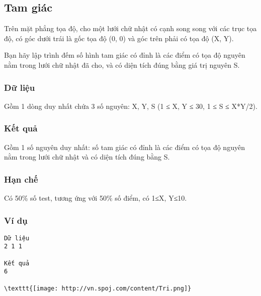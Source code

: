 



\subsection{   Tam giác  }

   Trên mặt phẳng tọa độ, cho một lưới chữ nhật có cạnh song song với các trục tọa độ,  có góc dưới   trái là gốc tọa độ (0, 0) và góc trên phải  có tọa độ (X, Y).  

   Bạn hãy lập trình đếm số hình tam giác có đỉnh là các điểm có tọa độ nguyên nằm trong lưới chữ   nhật đã cho, và có diện tích đúng bằng giá trị nguyên S.  

\subsubsection{   Dữ liệu  }

   Gồm 1 dòng duy nhất chứa 3 số nguyên: X, Y, S (1 ≤ X, Y ≤ 30, 1 ≤ S ≤ X*Y/2).  

\subsubsection{   Kết quả  }

   Gồm 1 số nguyên duy nhất: số tam giác có đỉnh là các điểm có tọa độ nguyên nằm trong lưới chữ   nhật và có diện tích đúng bằng S.  

\subsubsection{   Hạn chế  }

   Có 50\% số test, tương ứng với 50\% số điểm, có 1≤X, Y≤10.  

\subsubsection{   Ví dụ  }
\begin{verbatim}
Dữ liệu
2 1 1	

Kết quả
6 

\texttt{[image: http://vn.spoj.com/content/Tri.png]}\end{verbatim}